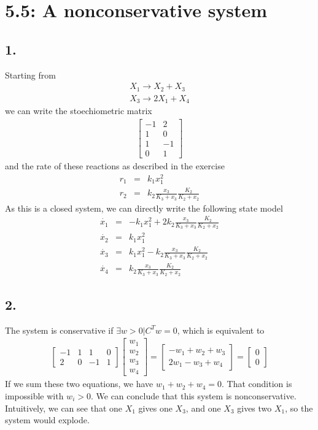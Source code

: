\section*{5.5: A nonconservative system}
\subsection*{1.}
Starting from
\begin{eqnarray*}
X_1\rightarrow X_2+X_3 \\
X_3\rightarrow 2X_1+X_4
\end{eqnarray*}
we can write the stoechiometric matrix
\begin{eqnarray*}
\begin{bmatrix}
-1 & 2 \\
1 & 0 \\
1 & -1 \\
0 & 1
\end{bmatrix}
\end{eqnarray*}
and the rate of these reactions as described in the exercise
\begin{eqnarray*}
r_1 &=& k_1 x_1^2\\
r_2 &=& k_2 \frac{x_3}{K_3+x_3}\frac{K_2}{K_2+x_2}
\end{eqnarray*}
As this is a closed system, we can directly write the following state model
\begin{eqnarray*}
\dot{x_1} &=& - k_1 x_1^2 + 2k_2 \frac{x_3}{K_3+x_3}\frac{K_2}{K_2+x_2} \\
\dot{x_2} &=& k_1 x_1^2  \\
\dot{x_3} &=& k_1 x_1^2 - k_2 \frac{x_3}{K_3+x_3}\frac{K_2}{K_2+x_2} \\
\dot{x_4} &=& k_2 \frac{x_3}{K_3+x_3}\frac{K_2}{K_2+x_2}
\end{eqnarray*}


\subsection*{2.}
The system is conservative if $\exists w>0 | C^Tw = 0$, which is equivalent to
\begin{eqnarray*}
\begin{bmatrix}
-1 & 1 & 1 &0\\
2 & 0 & -1 & 1
\end{bmatrix}
\begin{bmatrix}
w_1 \\
w_2\\
w_3\\
w_4
\end{bmatrix} = \begin{bmatrix}
-w_1+w_2+w_3 \\
2w_1-w_3+w_4
\end{bmatrix} = \begin{bmatrix}
0 \\
0
\end{bmatrix}
\end{eqnarray*}
If we sum these two equations, we have $w_1+w_2+w_4=0$. That condition is impossible with $w_i > 0$. We can conclude that this system is nonconservative. Intuitively, we can see that one $X_1$ gives one $X_3$, and one $X_3$ gives two $X_1$, so the system would explode.

